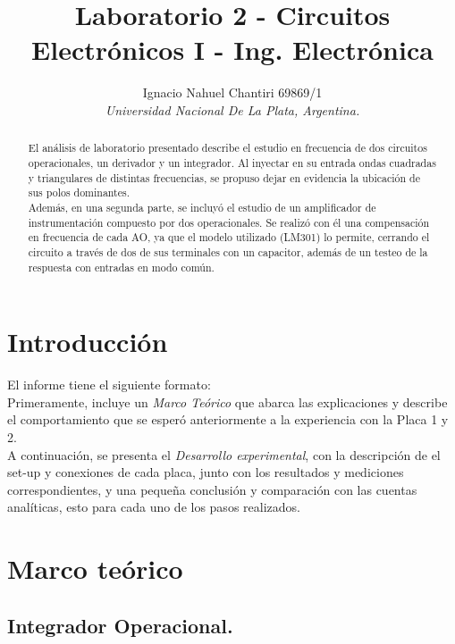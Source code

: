 \documentclass[letterpaper, 10 pt, conference]{ieeeconf}  %
\title{\LARGE \bf
Laboratorio 2 - Circuitos Electrónicos I - Ing. Electrónica
}
\author{Ignacio Nahuel Chantiri 69869/1 \\  %
{\it Universidad Nacional De La Plata, Argentina.}}                              %
\begin{document}
\maketitle
\thispagestyle{empty}
\pagestyle{empty}


\begin{abstract}

El análisis de laboratorio presentado describe el estudio en frecuencia de dos circuitos operacionales, un derivador y un integrador. Al inyectar en su entrada ondas cuadradas y triangulares de distintas frecuencias, se propuso dejar en evidencia la ubicación de sus polos dominantes.\\
Además, en una segunda parte, se incluyó el estudio de un amplificador de instrumentación compuesto por dos operacionales.
Se realizó con él una compensación en frecuencia de cada AO, ya que el modelo utilizado (LM301) lo permite, cerrando el circuito a través de dos de sus terminales con un capacitor, además de un testeo de la respuesta con entradas en modo común.

\end{abstract}


\section{Introducci\'on}

El informe tiene el siguiente formato:\\
Primeramente, incluye un \textit{Marco Teórico} que abarca las explicaciones y describe el comportamiento que se esperó anteriormente a la experiencia con la Placa 1 y 2.\\ A continuación, se presenta el \textit{Desarrollo experimental}, con la descripción de el set-up y conexiones de cada placa, junto con los resultados y mediciones correspondientes, y una pequeña conclusión y comparación con las cuentas analíticas, esto para cada uno de los pasos realizados.


\section{Marco teórico}


\subsection{Integrador Operacional.}
\end{document}
